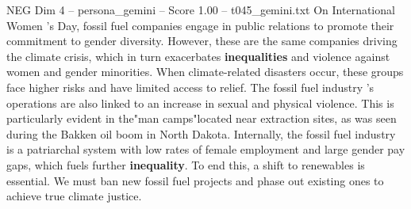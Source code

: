 \begin{textsample}{NEG Dim 4 – persona\_gemini – Score 1.00 – t045\_gemini.txt}  \label{ex:f4_neg_015}
On International Women ’s Day, fossil fuel companies engage in public relations to promote their commitment to gender diversity.
However, these are the same companies driving the climate crisis, which in turn exacerbates \textbf{inequalities} and violence against women and gender minorities.
When climate-related disasters occur, these groups face higher risks and have limited access to relief.
The fossil fuel industry ’s operations are also linked to an increase in sexual and physical violence.
This is particularly evident in the"man camps"located near extraction sites, as was seen during the Bakken oil boom in North Dakota.
Internally, the fossil fuel industry is a patriarchal system with low rates of female employment and large gender pay gaps, which fuels further \textbf{inequality}.
To end this, a shift to renewables is essential.
We must ban new fossil fuel projects and phase out existing ones to achieve true climate justice.

\end{textsample}
